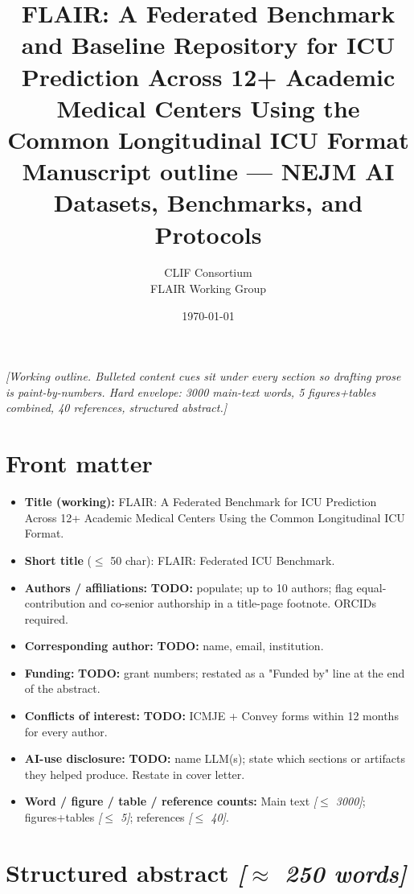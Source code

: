 \documentclass[11pt]{article}
\title{\textbf{FLAIR: A Federated Benchmark and Baseline Repository for
ICU Prediction Across 12+ Academic Medical Centers Using the Common
Longitudinal ICU Format} \\[0.4em]
\large Manuscript outline --- NEJM AI Datasets, Benchmarks, and Protocols}
\author{CLIF Consortium \\ FLAIR Working Group}
\date{\today}
\newcommand{\note}[1]{{\color{notecolor}\textit{[#1]}}}
\newcommand{\todo}[1]{{\color{red}\textbf{TODO:} #1}}
\begin{document}
\maketitle

\note{Working outline. Bulleted content cues sit under every section so
drafting prose is paint-by-numbers. Hard envelope: 3000 main-text words,
5 figures+tables combined, 40 references, structured abstract.}

\section*{Front matter}
\begin{itemize}[leftmargin=1.5em]
  \item \textbf{Title (working):} FLAIR: A Federated Benchmark for ICU
        Prediction Across 12+ Academic Medical Centers Using the Common
        Longitudinal ICU Format.
  \item \textbf{Short title} ($\le$ 50 char): FLAIR: Federated ICU Benchmark.
  \item \textbf{Authors / affiliations:} \todo{populate; up to 10 authors;
        flag equal-contribution and co-senior authorship in a title-page
        footnote. ORCIDs required.}
  \item \textbf{Corresponding author:} \todo{name, email, institution.}
  \item \textbf{Funding:} \todo{grant numbers; restated as a "Funded by"
        line at the end of the abstract.}
  \item \textbf{Conflicts of interest:} \todo{ICMJE + Convey forms within
        12 months for every author.}
  \item \textbf{AI-use disclosure:} \todo{name LLM(s); state which sections
        or artifacts they helped produce. Restate in cover letter.}
  \item \textbf{Word / figure / table / reference counts:}
        Main text \note{$\le$ 3000}; figures+tables \note{$\le$ 5};
        references \note{$\le$ 40}.
\end{itemize}

\section*{Structured abstract \note{$\approx$ 250 words}}
\end{document}
